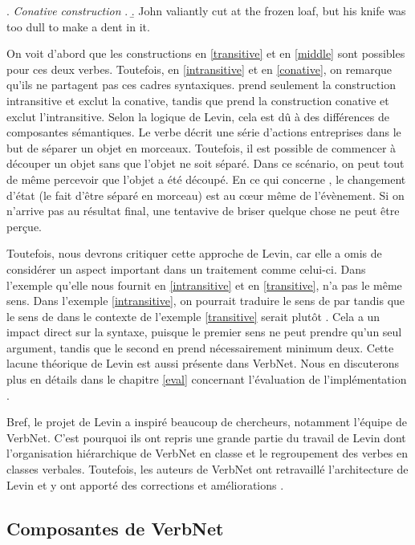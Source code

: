 \ex. \label{conative} \emph{Conative construction}
	\a.
	\b. John valiantly cut at the frozen loaf, but his knife was too dull to make a dent in it.

On voit d'abord que les constructions en \ref{transitive} et en \ref{middle} sont possibles pour ces deux verbes. Toutefois, en \ref{intransitive} et en \ref{conative}, on remarque qu'ils ne partagent pas ces cadres syntaxiques.  prend seulement la construction intransitive et exclut la conative, tandis que  prend la construction conative et exclut l'intransitive. Selon la logique de Levin, cela est dû à des différences de composantes sémantiques. Le verbe  décrit une série d'actions entreprises dans le but de séparer un objet en morceaux. Toutefois, il est possible de commencer à découper un objet sans que l'objet ne soit séparé. Dans ce scénario, on peut tout de même percevoir que l'objet a été découpé. En ce qui concerne , le changement d'état (le fait d'être séparé en morceau) est au c\oe{}ur même de l'évènement. Si on n'arrive pas au résultat final, une tentavive de briser quelque chose ne peut être perçue. 

Toutefois, nous devrons critiquer cette approche de Levin, car elle a omis de considérer un aspect important dans un traitement comme celui-ci. Dans l'exemple qu'elle nous fournit en \ref{intransitive} et en \ref{transitive},  n'a pas le même sens. Dans l'exemple \ref{intransitive}, on pourrait traduire le sens de  par  tandis que le sens de  dans le contexte de l'exemple \ref{transitive} serait plutôt . Cela a un impact direct sur la syntaxe, puisque le premier sens ne peut prendre qu'un seul argument, tandis que le second en prend nécessairement minimum deux. Cette lacune théorique de Levin est aussi présente dans VerbNet. Nous en discuterons plus en détails dans le chapitre \ref{eval} concernant l'évaluation de l'implémentation .

Bref, le projet de Levin a inspiré beaucoup de chercheurs, notamment l'équipe de VerbNet. C'est pourquoi ils ont repris une grande partie du travail de Levin dont l'organisation hiérarchique de VerbNet en classe et le regroupement des verbes en classes verbales. Toutefois, les auteurs de VerbNet ont retravaillé l'architecture de Levin et y ont apporté des corrections et améliorations \citep{verbnet.2006}.

\subsection {Composantes de VerbNet}  

